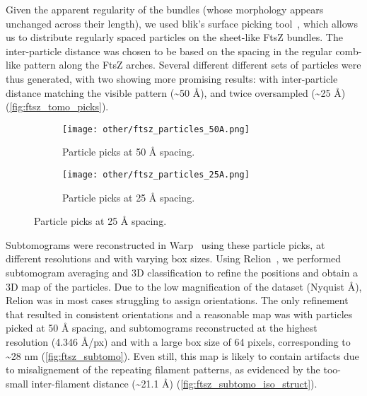Given the apparent regularity of the bundles (whose morphology appears unchanged across their length), we used blik's surface picking tool~\cite{gaifasBlikExtensible3D2024,gaifasBlikPythonTool2024}, which allows us to distribute regularly spaced particles on the sheet-like FtsZ bundles.
The inter-particle distance was chosen to be based on the spacing in the regular comb-like pattern along the FtsZ arches.
Several different different sets of particles were thus generated, with two showing more promising results: with inter-particle distance matching the visible pattern (\sim50 Å), and twice oversampled (\sim25 Å) (\autoref{fig:ftsz_tomo_picks}).

\begin{figure}[ht]
    \centering
    \begin{subfigure}[B]{.49\textwidth}
        \centering
        \texttt{[image: other/ftsz\_particles\_50A.png]}
        \caption{Particle picks at 50 Å spacing.}
        \label{fig:ftsz_tomo_picks_50}
    \end{subfigure}%
    \hfill
    \begin{subfigure}[B]{.49\textwidth}
        \centering
        \texttt{[image: other/ftsz\_particles\_25A.png]}
        \caption{Particle picks at 25 Å spacing.}
        \label{fig:ftsz_tomo_picks_25}
    \end{subfigure}%
    \label{fig:ftsz_tomo_picks}
\end{figure}

Subtomograms were reconstructed in Warp~\cite{tegunovRealtimeCryoelectronMicroscopy2019} using these particle picks, at different resolutions and with varying box sizes.
Using Relion~\cite{scheresRELIONImplementationBayesian2012,zivanovBayesianApproachSingleparticle2022,burtImageProcessingPipeline2024}, we performed subtomogram averaging and 3D classification to refine the positions and obtain a 3D map of the particles.
Due to the low magnification of the dataset (Nyquist  Å), Relion was in most cases struggling to assign orientations.
The only refinement that resulted in consistent orientations and a reasonable map was with particles picked at 50 Å spacing, and subtomograms reconstructed at the highest resolution (4.346 Å/px) and with a large box size of 64 pixels, corresponding to \sim28 nm (\autoref{fig:ftsz_subtomo}).
Even still, this map is likely to contain artifacts due to misalignement of the repeating filament patterns, as evidenced by the too-small inter-filament distance (\sim21.1 Å) (\autoref{fig:ftsz_subtomo_iso_struct}).

